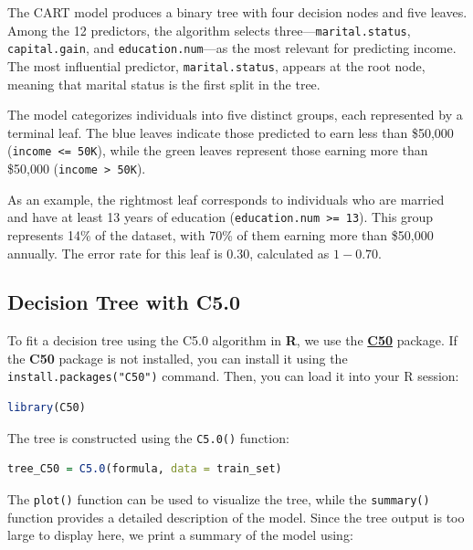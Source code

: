 \documentclass[
  11pt,
]{book}
\newcommand{\passthrough}[1]{#1}
\theoremstyle{definition}
\theoremstyle{definition}
\theoremstyle{definition}
\theoremstyle{definition}
\theoremstyle{remark}
\begin{document}
The CART model produces a binary tree with four decision nodes and five leaves. Among the 12 predictors, the algorithm selects three---\passthrough{\lstinline!marital.status!}, \passthrough{\lstinline!capital.gain!}, and \passthrough{\lstinline!education.num!}---as the most relevant for predicting income. The most influential predictor, \passthrough{\lstinline!marital.status!}, appears at the root node, meaning that marital status is the first split in the tree.

The model categorizes individuals into five distinct groups, each represented by a terminal leaf. The blue leaves indicate those predicted to earn less than \$50,000 (\passthrough{\lstinline!income <= 50K!}), while the green leaves represent those earning more than \$50,000 (\passthrough{\lstinline!income > 50K!}).

As an example, the rightmost leaf corresponds to individuals who are married and have at least 13 years of education (\passthrough{\lstinline!education.num >= 13!}). This group represents 14\% of the dataset, with 70\% of them earning more than \$50,000 annually. The error rate for this leaf is 0.30, calculated as \(1 - 0.70\).

\subsection*{Decision Tree with C5.0}\label{decision-tree-with-c5.0}


To fit a decision tree using the C5.0 algorithm in \textbf{R}, we use the \href{https://CRAN.R-project.org/package=C50}{\textbf{C50}} package. If the \textbf{C50} package is not installed, you can install it using the \passthrough{\lstinline!install.packages("C50")!} command. Then, you can load it into your R session:

\begin{lstlisting}[language=R]
library(C50)
\end{lstlisting}

The tree is constructed using the \passthrough{\lstinline!C5.0()!} function:

\begin{lstlisting}[language=R]
tree_C50 = C5.0(formula, data = train_set) 
\end{lstlisting}

The \passthrough{\lstinline!plot()!} function can be used to visualize the tree, while the \passthrough{\lstinline!summary()!} function provides a detailed description of the model. Since the tree output is too large to display here, we print a summary of the model using:
\end{document}
